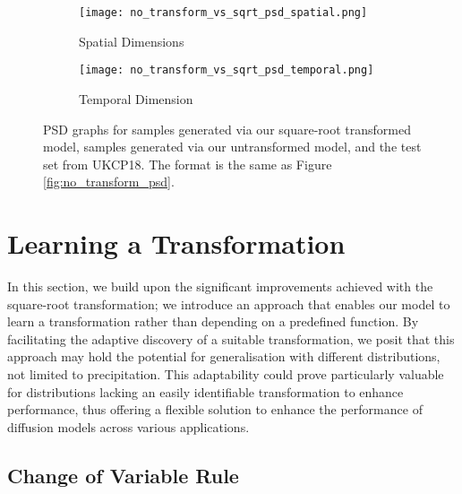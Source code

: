 \documentclass[ oneside,%
                    author={George Herbert},
                    degree={MSci},
                     title={Diffusion Models for Time-Evolving Precipitation Fields},
                  subtitle={}]{dissertation}
\begin{document}
\begin{figure}[htbp]
      \centering
      \begin{subfigure}{0.49\textwidth}
            \texttt{[image: no\_transform\_vs\_sqrt\_psd\_spatial.png]}
            \caption{Spatial Dimensions}
      \end{subfigure}
      \begin{subfigure}{0.49\textwidth}
            \texttt{[image: no\_transform\_vs\_sqrt\_psd\_temporal.png]}
            \caption{Temporal Dimension}
      \end{subfigure}
      \caption{PSD graphs for samples generated via our square-root transformed model, samples generated via our untransformed model, and the test set from UKCP18. The format is the same as Figure \ref{fig:no_transform_psd}.}
      \label{fig:no_transform_vs_sqrt_psd}
\end{figure}

\section{Learning a Transformation}
\label{sec:results_learning_transformation}

In this section, we build upon the significant improvements achieved with the square-root transformation; we introduce an approach that enables our model to learn a transformation rather than depending on a predefined function. By facilitating the adaptive discovery of a suitable transformation, we posit that this approach may hold the potential for generalisation with different distributions, not limited to precipitation. This adaptability could prove particularly valuable for distributions lacking an easily identifiable transformation to enhance performance, thus offering a flexible solution to enhance the performance of diffusion models across various applications.

\subsection{Change of Variable Rule}
\label{sec:results_change_of_variable}
\end{document}
